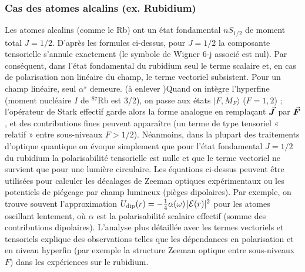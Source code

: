 \subsubsection{Cas des atomes alcalins (ex. Rubidium)}

Les atomes alcalins (comme le Rb) ont un état fondamental $nS_{1/2}$ de moment total $J=1/2$. D’après les formules ci-dessus, pour $J=1/2$ la composante tensorielle s’annule exactement (le symbole de Wigner 6-j associé est nul). Par conséquent, dans l’état fondamental du rubidium seul le terme scalaire et, en cas de polarisation non linéaire du champ, le terme vectoriel subsistent. Pour un champ linéaire, seul $\alpha^s$ demeure. {\color{black} (à enlever )Quand on intègre l’hyperfine (moment nucléaire $I$ de $^{87}$Rb est 3/2), on passe aux états $|F,M_F\rangle$ ($F=1,2$) ; l’opérateur de Stark effectif garde alors la forme analogue en remplaçant $\vec{{\bm{J}}}$ par $\vec{{\bm{F}}}$, et des contributions fines peuvent apparaître (un terme de type tensoriel « relatif » entre sous-niveaux $F>1/2$). Néanmoins, dans la plupart des traitements d’optique quantique on évoque simplement que pour l’état fondamental $J=1/2$ du rubidium la polarisabilité tensorielle est nulle et que le terme vectoriel ne survient que pour une lumière circulaire. Les équations ci-dessus peuvent être utilisées pour calculer les décalages de Zeeman optiques expérimentaux ou les potentiels de piégeage par champ lumineux (pièges dipolaires). Par exemple, on trouve souvent l’approximation $U_{\rm dip}(r)=-\frac{1}{4}\alpha(\omega)\,|\mathcal{E}(r)|^2$ pour les atomes oscillant lentement, où $\alpha$ est la polarisabilité scalaire effectif (somme des contributions dipolaires). L’analyse plus détaillée avec les termes vectoriels et tensoriels explique des observations telles que les dépendances en polarisation et en niveau hyperfin (par exemple la structure Zeeman optique entre sous-niveaux $F$) dans les expériences sur le rubidium.}
